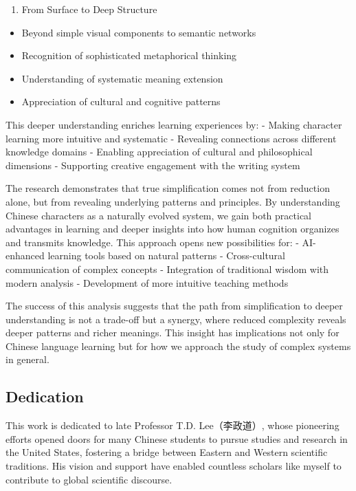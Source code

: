 \documentclass[
  11pt,
  letterpaper,
]{article}
\providecommand{\tightlist}{%
  \setlength{\itemsep}{0pt}\setlength{\parskip}{0pt}}
\begin{document}
\begin{enumerate}
\def\labelenumi{\arabic{enumi}.}
\setcounter{enumi}{3}
\tightlist
\item
  From Surface to Deep Structure
\end{enumerate}

\begin{itemize}
\tightlist
\item
  Beyond simple visual components to semantic networks
\item
  Recognition of sophisticated metaphorical thinking
\item
  Understanding of systematic meaning extension
\item
  Appreciation of cultural and cognitive patterns
\end{itemize}

This deeper understanding enriches learning experiences by: - Making
character learning more intuitive and systematic - Revealing connections
across different knowledge domains - Enabling appreciation of cultural
and philosophical dimensions - Supporting creative engagement with the
writing system

The research demonstrates that true simplification comes not from
reduction alone, but from revealing underlying patterns and principles.
By understanding Chinese characters as a naturally evolved system, we
gain both practical advantages in learning and deeper insights into how
human cognition organizes and transmits knowledge. This approach opens
new possibilities for: - AI-enhanced learning tools based on natural
patterns - Cross-cultural communication of complex concepts -
Integration of traditional wisdom with modern analysis - Development of
more intuitive teaching methods

The success of this analysis suggests that the path from simplification
to deeper understanding is not a trade-off but a synergy, where reduced
complexity reveals deeper patterns and richer meanings. This insight has
implications not only for Chinese language learning but for how we
approach the study of complex systems in general.

\subsection{Dedication}\label{dedication}

This work is dedicated to late Professor T.D. Lee（李政道）, whose
pioneering efforts opened doors for many Chinese students to pursue
studies and research in the United States, fostering a bridge between
Eastern and Western scientific traditions. His vision and support have
enabled countless scholars like myself to contribute to global
scientific discourse.
\end{document}
